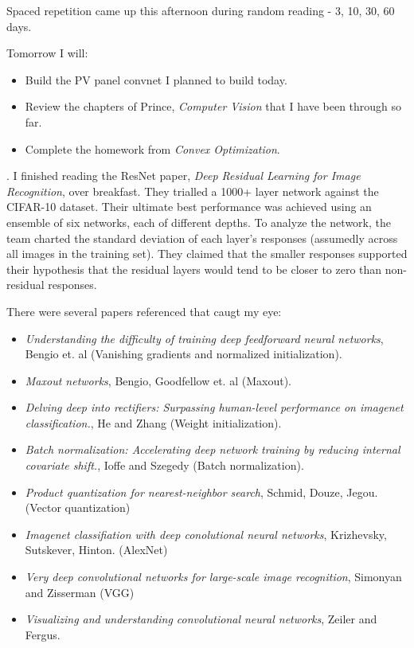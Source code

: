 \documentclass[idxtotoc,hyperref,openany]{labbook} %
\begin{document}
Spaced repetition came up this afternoon during random reading - 3, 10, 30, 60 days.

Tomorrow I will:
\begin{itemize}
	\item Build the PV panel convnet I planned to build today.
	\item Review the chapters of Prince, \emph{Computer Vision} that I have been through so far.
	\item Complete the homework from \emph{Convex Optimization}.
\end{itemize}



.
I finished reading the ResNet paper, \emph{Deep Residual Learning for Image Recognition}, over  breakfast. They trialled a 1000+ layer network against the CIFAR-10 dataset. Their ultimate best performance was achieved using an ensemble of six networks, each of different depths. To analyze the network, the team charted the standard deviation of each layer's responses (assumedly across all images in the training set). They claimed that the smaller responses supported their hypothesis that the residual layers would tend to be closer to zero than non-residual responses.

There were several papers referenced that caugt my eye:
\begin{itemize}
	\item\emph{Understanding the difficulty of training deep feedforward neural networks}, Bengio et. al (Vanishing gradients and normalized initialization).
	\item \emph{Maxout networks}, Bengio, Goodfellow et. al (Maxout).
	\item \emph{Delving deep into rectifiers: Surpassing human-level performance on imagenet classification.}, He and Zhang (Weight initialization).
	\item \emph{Batch normalization: Accelerating deep network training by reducing internal covariate shift.}, Ioffe and Szegedy (Batch normalization).
	\item \emph{Product quantization for nearest-neighbor search}, Schmid, Douze, Jegou. (Vector quantization)
	\item \emph{Imagenet classifiation with deep conolutional neural networks}, Krizhevsky, Sutskever, Hinton. (AlexNet)
	\item \emph{Very deep convolutional networks for large-scale image recognition}, Simonyan and Zisserman (VGG)
	\item \emph{Visualizing and understanding convolutional neural networks}, Zeiler and Fergus.
\end{itemize}
\end{document}
